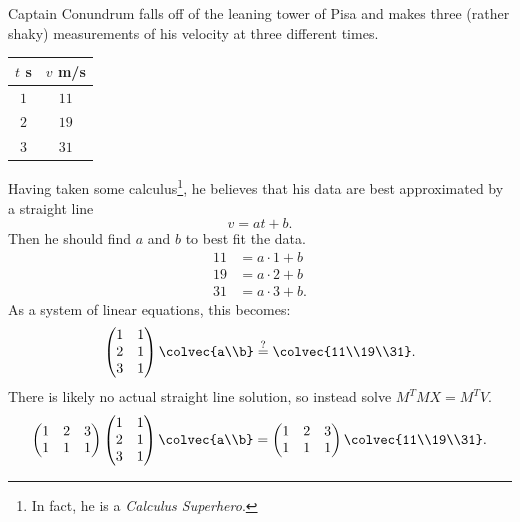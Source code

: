 \begin{example}
Captain Conundrum falls off of the leaning tower of Pisa and makes three (rather shaky) measurements of his velocity at three different times.

\begin{center}
\begin{tabular}{c|c}
$t$ s & $v $ m/s \\ \hline
$1$ & $11$ \\
$2$ & $19$ \\
$3$ & $31$
\end{tabular}
\end{center}

Having taken some calculus\footnote{In fact, he is a \emph{Calculus Superhero}.}, he believes that his data are best approximated by a straight line
\[
v = at+b.
\]
Then he should find $a$ and $b$ to best fit the data.
\begin{align*}
11 &= a\cdot 1 + b \\
19 &= a\cdot 2 + b \\
31 &= a\cdot 3 + b.
\end{align*}
As a system of linear equations, this becomes:
\[
\begin{pmatrix}
1 & 1 \\
2 & 1 \\
3 & 1 \\
\end{pmatrix}
\colvec{a\\b} \stackrel{?}{=}
\colvec{11\\19\\31}.
\]
There is likely no actual straight line solution, so instead solve $M^TMX=M^TV$.
\[
\begin{pmatrix}
1 & 2 & 3 \\
1 & 1 & 1 \\
\end{pmatrix}
\begin{pmatrix}
1 & 1 \\
2 & 1 \\
3 & 1 \\
\end{pmatrix} \colvec{a\\b}
= 
\begin{pmatrix}
1 & 2 & 3 \\
1 & 1 & 1 \\
\end{pmatrix}
\colvec{11\\19\\31}.
\]
\end{example}
